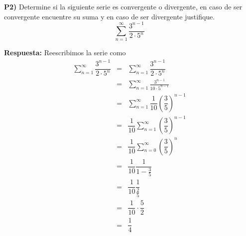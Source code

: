 \documentclass{article}
\begin{document}
\newpage
\noindent\textbf{P2) } Determine si la siguiente serie es convergente o divergente, en caso de ser convergente encuentre su suma y en caso de ser divergente justifique.
$$\sum_{n=1}^\infty \dfrac{3^{n-1}}{2\cdot5^n}$$

\noindent\textbf{Respuesta:} Reescribimos la serie como
\begin{eqnarray*}
  \sum_{n=1}^\infty \dfrac{3^{n-1}}{2\cdot5^n} &=& \sum_{n=1}^\infty \dfrac{3^{n-1}}{2\cdot5^n}\\
  &=& \sum_{n=1}^\infty \frac{3^{n-1}}{10\cdot5^{n-1}}\\
  &=& \sum_{n=1}^\infty \dfrac{1}{10}\left(\dfrac{3}{5}\right)^{n-1}\\
  &=& \dfrac{1}{10}\sum_{n=1}^\infty \left(\dfrac{3}{5}\right)^{n-1}\\
  &=& \dfrac{1}{10}\sum_{n=0}^\infty \left(\dfrac{3}{5}\right)^{n}\\
  &=& \dfrac{1}{10}\dfrac{1}{1-\frac{3}{5}}\\
  &=& \dfrac{1}{10}\dfrac{1}{\frac{2}{5}}\\
  &=& \dfrac{1}{10}\cdot\dfrac{5}{2}\\
  &=& \dfrac{1}{4}
\end{eqnarray*}
\end{document}
